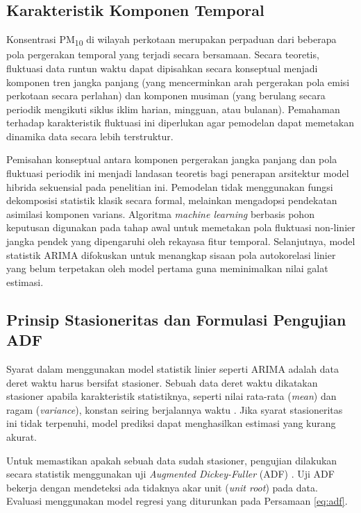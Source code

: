 \subsection{Karakteristik Komponen Temporal}

Konsentrasi PM\textsubscript{10} di wilayah perkotaan merupakan perpaduan dari beberapa pola pergerakan temporal yang terjadi secara bersamaan. Secara teoretis, fluktuasi data runtun waktu dapat dipisahkan secara konseptual menjadi komponen tren jangka panjang (yang mencerminkan arah pergerakan pola emisi perkotaan secara perlahan) dan komponen musiman (yang berulang secara periodik mengikuti siklus iklim harian, mingguan, atau bulanan). Pemahaman terhadap karakteristik fluktuasi ini diperlukan agar pemodelan dapat memetakan dinamika data secara lebih terstruktur.

Pemisahan konseptual antara komponen pergerakan jangka panjang dan pola fluktuasi periodik ini menjadi landasan teoretis bagi penerapan arsitektur model hibrida sekuensial pada penelitian ini. Pemodelan tidak menggunakan fungsi dekomposisi statistik klasik secara formal, melainkan mengadopsi pendekatan asimilasi komponen varians. Algoritma \textit{machine learning} berbasis pohon keputusan digunakan pada tahap awal untuk memetakan pola fluktuasi non-linier jangka pendek yang dipengaruhi oleh rekayasa fitur temporal. Selanjutnya, model statistik ARIMA difokuskan untuk menangkap sisaan pola autokorelasi linier yang belum terpetakan oleh model pertama guna meminimalkan nilai galat estimasi.

\subsection{Prinsip Stasioneritas dan Formulasi Pengujian ADF}

Syarat dalam menggunakan model statistik linier seperti ARIMA adalah data deret waktu harus bersifat stasioner. Sebuah data deret waktu dikatakan stasioner apabila karakteristik statistiknya, seperti nilai rata-rata (\textit{mean}) dan ragam (\textit{variance}), konstan seiring berjalannya waktu \autocite{minitab2025adf}. Jika syarat stasioneritas ini tidak terpenuhi, model prediksi dapat menghasilkan estimasi yang kurang akurat.

Untuk memastikan apakah sebuah data sudah stasioner, pengujian dilakukan secara statistik menggunakan uji \textit{Augmented Dickey-Fuller} (ADF) \autocite{vasconcelos2025stationarity}. Uji ADF bekerja dengan mendeteksi ada tidaknya akar unit (\textit{unit root}) pada data. Evaluasi menggunakan model regresi yang diturunkan pada Persamaan \ref{eq:adf}.

